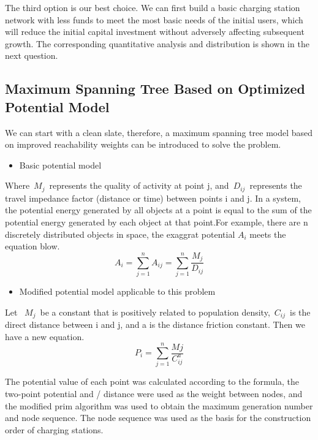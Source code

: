 \documentclass[12pt]{article}  %
\begin{document}
The third option is our best choice. We can first build a basic charging station network with less funds to meet the most basic needs of the initial users, which will reduce the initial capital investment without adversely affecting subsequent growth. The corresponding quantitative analysis and distribution is shown in the next question.
\subsection{Maximum Spanning Tree Based on Optimized Potential Model}
We can start with a clean slate, therefore, a maximum spanning tree model based on improved reachability weights can be introduced to solve the problem.
\begin{itemize}
	\item Basic potential model
\end{itemize}

Where\ ${M_j}$\ represents the quality of activity at point j, and\  ${D_{ij}}$\  represents the travel impedance factor (distance or time) between points i and j.
In a system, the potential energy generated by all objects at a point is equal to the sum of the potential energy generated by each object at that point.For example, there are n discretely distributed objects in space, the exaggrat potential ${A_i}$ meets the equation blow.
\begin{equation}
		A_{i}=\sum\limits_{j=1}^{n} A_{i j}=\sum\limits_{j=1}^{n} \frac{M_{j}}{D_{i j}}
\end{equation}
\begin{itemize}
	\item Modified potential model applicable to this problem
\end{itemize}

Let \ ${M_j}$\  be a constant that is positively related to population density,\ ${C_{ij}}$\  is the direct distance between i and j, and a is the distance friction constant. Then we have a new equation.
\begin{equation}
	P_{i}=\sum_{j=1}^{n} \frac{M j}{C_{i j}^{a}}
\end{equation}

The potential value of each point was calculated according to the formula, the two-point potential and / distance were used as the weight between nodes, and the modified prim algorithm was used to obtain the maximum generation number and node sequence. The node sequence was used as the basis for the construction order of charging stations.
\end{document}
